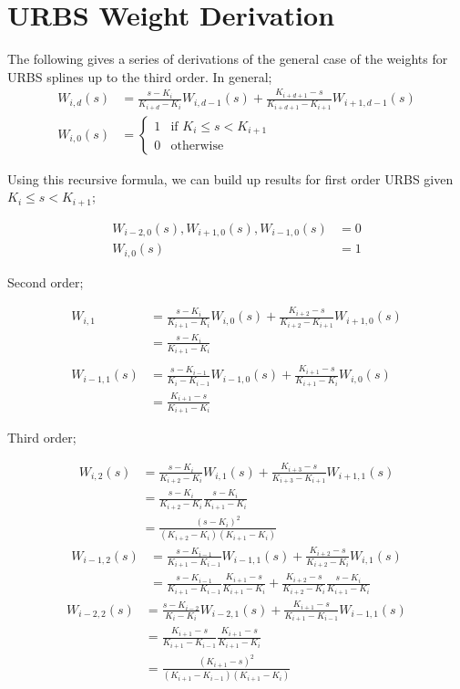 \chapter{URBS Weight Derivation}
The following \cite{website:nurbsExplain} gives a series of derivations of the general case of the weights for URBS splines up to the third order.
In general;
\begin{align*}
W_{i,d}(s) &=   \frac{s - K_i}{K_{i+d} - K_i}W_{i,d-1}(s)  +  \frac{K_{i + d + 1} - s}{K_{i + d + 1} - K_{i+1}}W_{i+1,d-1}(s)\\
W_{i,0}(s) &= \begin{cases}
   1 & \text{if } K_i \leq s < K_{i+1} \\
   0 & \text{otherwise}
  \end{cases}	
\end{align*}

Using this recursive formula, we can build up results for first order URBS given $K_i \leq s < K_{i+1}$;

\begin{align*}	
W_{i-2,0}(s),W_{i+1,0}(s), W_{i-1,0}(s) &= 0\\
W_{i,0}(s) &= 1 
\end{align*}

Second order;

\begin{align*}	
W_{i,1} &= \frac{s - K_i}{K_{i+1} - K_i}W_{i,0}(s)  +  \frac{K_{i + 2} - s}{K_{i + 2} - K_{i+1}}W_{i+1,0}(s)\\
	 &= \frac{s - K_i}{K_{i+1} - K_i}\\
	 \\
W_{i-1,1}(s) &=   \frac{s - K_{i-1}}{K_{i} - K_{i-1}}W_{i-1,0}(s)  +  \frac{K_{i + 1} - s}{K_{i + 1} - K_{i}}W_{i,0}(s)\\
	&=\frac{K_{i + 1} - s}{K_{i + 1} - K_{i}}
\end{align*}

Third order;

\begin{align*}
W_{i,2}(s) &= \frac{s - K_i}{K_{i+2} - K_i}W_{i,1}(s)  +  \frac{K_{i + 3} - s}{K_{i + 3} - K_{i+1}}W_{i+1,1}(s)\\ 
	&=   \frac{s - K_i}{K_{i+2} - K_i}\frac{s - K_i}{K_{i+1} - K_i}\\ 
	&= \frac{(s - K_i)^2}{(K_{i+2} - K_i)(K_{i+1} - K_i)}
\end{align*}
\begin{align*}
W_{i-1,2}(s) &= \frac{s - K_{i-1}}{K_{i+1} - K_{i-1}}W_{i-1,1}(s)  +  \frac{K_{i + 2} - s}{K_{i + 2} - K_{i}}W_{i,1}(s)\\ 
	 &= \frac{s - K_{i-1}}{K_{i+1} - K_{i-1}}\frac{K_{i + 1} - s}{K_{i + 1} - K_{i}} +  \frac{K_{i + 2} - s}{K_{i + 2} - K_{i}}\frac{s - K_i}{K_{i+1} - K_i}
\end{align*}
\begin{align*}
W_{i-2,2}(s) &= \frac{s - K_{i-2}}{K_{i} - K_{i}}W_{i-2,1}(s)  +  \frac{K_{i + 1} - s}{K_{i + 1} - K_{i-1}}W_{i-1,1}(s)\\
	&=\frac{K_{i + 1} - s}{K_{i + 1} - K_{i-1}}\frac{K_{i + 1} - s}{K_{i + 1} - K_{i}}\\
&=\frac{(K_{i + 1} - s)^2}{(K_{i + 1} - K_{i-1})(K_{i + 1} - K_{i})}
\end{align*}

